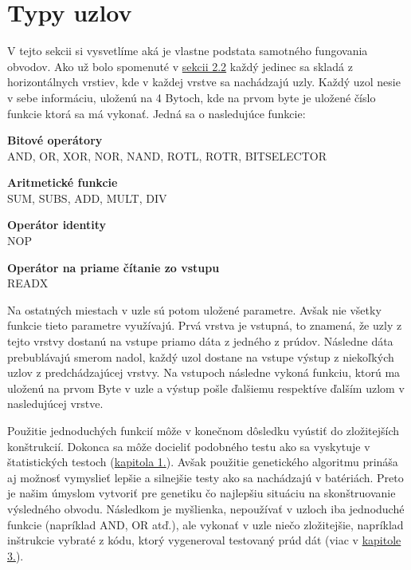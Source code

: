 \section{Typy uzlov}
\label{sec:nodes}

V tejto sekcii si vysvetlíme aká je vlastne podstata samotného fungovania obvodov. Ako už bolo spomenuté v \hyperref[sec:genetics]{sekcii 2.2} každý jedinec sa skladá z horizontálnych vrstiev, kde v každej vrstve sa nachádzajú uzly. Každý uzol nesie v sebe informáciu, uloženú na 4 Bytoch, kde na prvom byte je uložené číslo funkcie ktorá sa má vykonať. Jedná sa o nasledujúce funkcie:

\begin{myItemize}
	\item \textbf{Bitové operátory}\\AND, OR, XOR, NOR, NAND, ROTL, ROTR, BITSELECTOR
	\item \textbf{Aritmetické funkcie}\\SUM, SUBS, ADD, MULT, DIV
	\item \textbf{Operátor identity}\\NOP
	\item \textbf{Operátor na priame čítanie zo vstupu}\\READX
\end{myItemize}
Na ostatných miestach v uzle sú potom uložené parametre. Avšak nie všetky funkcie tieto parametre využívajú. Prvá vrstva je vstupná, to znamená, že uzly z tejto vrstvy dostanú na vstupe priamo dáta z jedného z prúdov. Následne dáta prebublávajú smerom nadol, každý uzol dostane na vstupe výstup z niekoľkých uzlov z predchádzajúcej vrstvy. Na vstupoch následne vykoná funkciu, ktorú ma uloženú na prvom Byte v uzle a výstup pošle ďalšiemu respektíve ďalším uzlom v nasledujúcej vrstve. 

Použitie jednoduchých funkcií môže v konečnom dôsledku vyústiť do zložitejších konštrukcií. Dokonca sa môže docieliť podobného testu ako sa vyskytuje v štatistických testoch (\hyperref[chap:statistic-tests]{kapitola 1.}). Avšak použitie genetického algoritmu prináša aj možnosť vymyslieť lepšie a silnejšie testy ako sa nachádzajú v batériách. Preto je našim úmyslom vytvoriť pre genetiku čo najlepšiu situáciu na skonštruovanie výsledného obvodu. Následkom je myšlienka, nepoužívať v uzloch iba jednoduché funkcie (napríklad AND, OR atď.), ale vykonať v uzle niečo zložitejšie, napríklad inštrukcie vybraté z kódu, ktorý vygeneroval testovaný prúd dát (viac v \hyperref[chap:eacirc-jvmsim]{kapitole 3.}).

